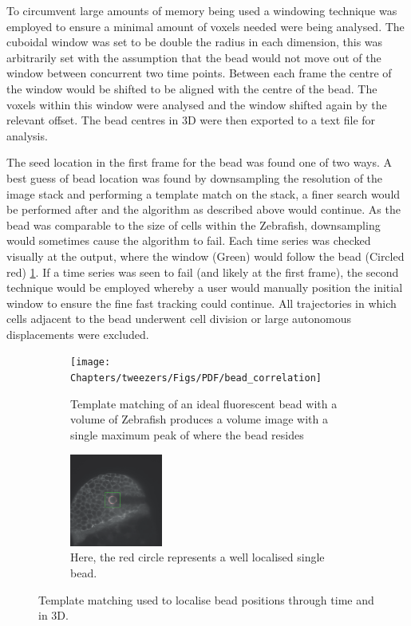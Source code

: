 To circumvent large amounts of memory being used a windowing technique was employed to ensure a minimal amount of voxels needed were being analysed.
The cuboidal window was set to be double the radius in each dimension, this was arbitrarily set with the assumption that the bead would not move out of the window between concurrent two time points.
Between each frame the centre of the window would be shifted to be aligned with the centre of the bead.
The voxels within this window were analysed and the window shifted again by the relevant offset.
The bead centres in 3D were then exported to a text file for analysis.

The seed location in the first frame for the bead was found one of two ways.
A best guess of bead location was found by downsampling the resolution of the image stack and performing a template match on the stack, a finer search would be performed after and the algorithm as described above would continue.
As the bead was comparable to the size of cells within the Zebrafish, downsampling would sometimes cause the algorithm to fail.
Each time series was checked visually at the output, where the window (Green) would follow the bead (Circled red) \ref{fig:bead_correlation}.
If a time series was seen to fail (and likely at the first frame), the second technique would be employed whereby a user would manually position the initial window to ensure the fine fast tracking could continue.
All trajectories in which cells adjacent to the bead underwent cell division or large autonomous displacements were excluded.

\begin{figure}[t!]
    \centering
    \begin{subfigure}[t]{0.4\textwidth}
        \centering
        \texttt{[image: Chapters/tweezers/Figs/PDF/bead\_correlation]}
        \caption{Template matching of an ideal fluorescent bead with a volume of Zebrafish produces a volume image with a single maximum peak of where the bead resides}
        \label{fig:bead_correlation}
    \end{subfigure}%
    \hspace{0.05\textwidth}
    \begin{subfigure}[t]{0.4\textwidth}
        \centering
        \includegraphics[height=1.2in]{Chapters/tweezers/Figs/PDF/bead_tracked}
        \caption{Here, the red circle represents a well localised single bead.}
        \label{fig:bead_tracked}
    \end{subfigure}
    \caption{Template matching used to localise bead positions through time and in 3D.  }
\end{figure}

